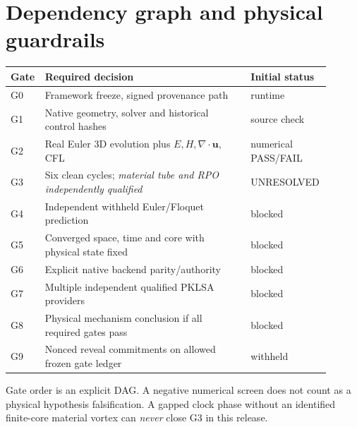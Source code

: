 \documentclass[11pt,a4paper]{article}
\begin{document}
\section{Dependency graph and physical guardrails}
\begin{longtable}{p{0.07\linewidth}p{0.63\linewidth}p{0.20\linewidth}}
\toprule Gate & Required decision & Initial status\\\midrule
G0 & Framework freeze, signed provenance path & runtime\\
G1 & Native geometry, solver and historical control hashes & source check\\
G2 & Real Euler 3D evolution plus $E,H,\nabla\cdot\mathbf u$, CFL & numerical PASS/FAIL\\
G3 & Six clean cycles; \emph{material tube and RPO independently qualified} & UNRESOLVED\\
G4 & Independent withheld Euler/Floquet prediction & blocked\\
G5 & Converged space, time and core with physical state fixed & blocked\\
G6 & Explicit native backend parity/authority & blocked\\
G7 & Multiple independent qualified PKLSA providers & blocked\\
G8 & Physical mechanism conclusion if all required gates pass & blocked\\
G9 & Nonced reveal commitments on allowed frozen gate ledger & withheld\\\bottomrule\end{longtable}
Gate order is an explicit DAG. A negative numerical screen does not count as a physical hypothesis falsification. A gapped clock phase without an identified finite-core material vortex can \emph{never} close G3 in this release.

\end{document}
